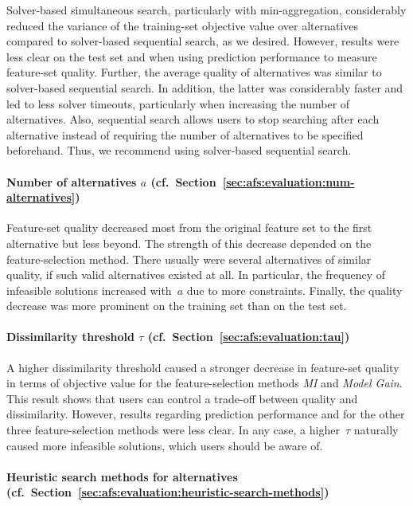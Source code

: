 \documentclass{article}
\theoremstyle{definition}
\begin{document}
Solver-based simultaneous search, particularly with min-aggregation, considerably reduced the variance of the training-set objective value over alternatives compared to solver-based sequential search, as we desired.
However, results were less clear on the test set and when using prediction performance to measure feature-set quality.
Further, the average quality of alternatives was similar to solver-based sequential search.
In addition, the latter was considerably faster and led to less solver timeouts, particularly when increasing the number of alternatives.
Also, sequential search allows users to stop searching after each alternative instead of requiring the number of alternatives to be specified beforehand.
Thus, we recommend using solver-based sequential search.

\paragraph{Number of alternatives $a$ (cf.~Section~\ref{sec:afs:evaluation:num-alternatives})}

Feature-set quality decreased most from the original feature set to the first alternative but less beyond.
The strength of this decrease depended on the feature-selection method.
There usually were several alternatives of similar quality, if such valid alternatives existed at all.
In particular, the frequency of infeasible solutions increased with~$a$ due to more constraints.
Finally, the quality decrease was more prominent on the training set than on the test set.

\paragraph{Dissimilarity threshold $\tau$ (cf.~Section~\ref{sec:afs:evaluation:tau})}

A higher dissimilarity threshold caused a stronger decrease in feature-set quality in terms of objective value for the feature-selection methods \emph{MI} and \emph{Model Gain}.
This result shows that users can control a trade-off between quality and dissimilarity.
However, results regarding prediction performance and for the other three feature-selection methods were less clear.
In any case, a higher~$\tau$ naturally caused more infeasible solutions, which users should be aware of.

\paragraph{Heuristic search methods for alternatives (cf.~Section~\ref{sec:afs:evaluation:heuristic-search-methods})}
\end{document}
